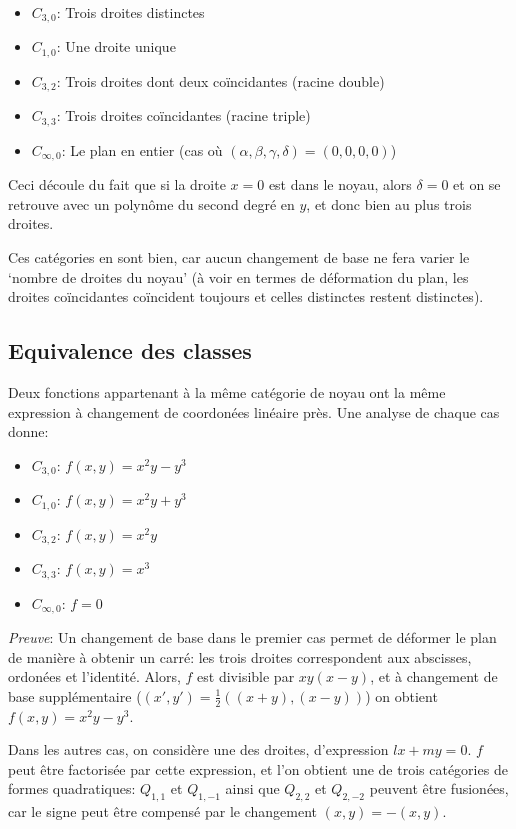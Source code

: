 \documentclass{article}
\begin{document}
\begin{itemize}
\item  $C_{3,0}$: Trois droites distinctes
\item  $C_{1,0}$: Une droite unique
\item  $C_{3,2}$: Trois droites dont deux coïncidantes (racine double)
\item  $C_{3,3}$: Trois droites coïncidantes (racine triple)
\item  $C_{\infty,0}$: Le plan en entier (cas où $(\alpha,\beta,\gamma,\delta)=(0,0,0,0)$)

\end{itemize}

Ceci découle du fait que si la droite $x=0$ est dans le noyau, alors $\delta=0$ et on se retrouve avec un polynôme du second degré en $y$, et donc bien au plus trois droites.

Ces catégories en sont bien, car aucun changement de base ne fera varier le `nombre de droites du noyau' (à voir en termes de déformation du plan, les droites coïncidantes coïncident toujours et celles distinctes restent distinctes).

\subsection{Equivalence des classes}

Deux fonctions appartenant à la même catégorie de noyau ont la même expression à changement de coordonées linéaire près. Une analyse de chaque cas donne:


\begin{itemize}
\item  $C_{3,0}$: $f(x,y)=x^2y-y^3$
\item  $C_{1,0}$: $f(x,y)=x^2y+y^3$
\item  $C_{3,2}$: $f(x,y)=x^2y$
\item  $C_{3,3}$: $f(x,y)=x^3$
\item  $C_{\infty,0}$: $f=0$

\end{itemize}

\textit{Preuve}: Un changement de base dans le premier cas permet de déformer le plan de manière à obtenir un carré: les trois droites correspondent aux abscisses, ordonées et l'identité. Alors, $f$ est divisible par $xy(x-y)$, et à changement de base supplémentaire ($(x',y')=\frac{1}{2}((x+y),(x-y))$) on obtient $f(x,y)=x^2y-y^3$.

Dans les autres cas, on considère une des droites, d'expression $lx+my=0$. $f$ peut être factorisée par cette expression, et l'on obtient une de trois catégories de formes quadratiques: $Q_{1,1}$ et $Q_{1,-1}$ ainsi que $Q_{2,2}$ et $Q_{2,-2}$ peuvent être fusionées, car le signe peut être compensé par le changement $(x,y)=-(x,y)$.
\end{document}
